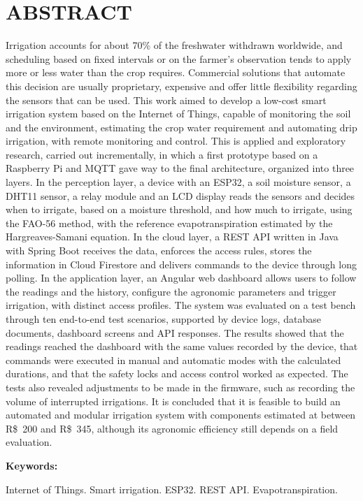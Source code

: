 \chapter*{ABSTRACT} 
\thispagestyle{empty}

Irrigation accounts for about 70\% of the freshwater withdrawn worldwide, and scheduling based on fixed intervals or on the farmer's observation tends to apply more or less water than the crop requires. Commercial solutions that automate this decision are usually proprietary, expensive and offer little flexibility regarding the sensors that can be used. This work aimed to develop a low-cost smart irrigation system based on the Internet of Things, capable of monitoring the soil and the environment, estimating the crop water requirement and automating drip irrigation, with remote monitoring and control. This is applied and exploratory research, carried out incrementally, in which a first prototype based on a Raspberry Pi and MQTT gave way to the final architecture, organized into three layers. In the perception layer, a device with an ESP32, a soil moisture sensor, a DHT11 sensor, a relay module and an LCD display reads the sensors and decides when to irrigate, based on a moisture threshold, and how much to irrigate, using the FAO-56 method, with the reference evapotranspiration estimated by the Hargreaves-Samani equation. In the cloud layer, a REST API written in Java with Spring Boot receives the data, enforces the access rules, stores the information in Cloud Firestore and delivers commands to the device through long polling. In the application layer, an Angular web dashboard allows users to follow the readings and the history, configure the agronomic parameters and trigger irrigation, with distinct access profiles. The system was evaluated on a test bench through ten end-to-end test scenarios, supported by device logs, database documents, dashboard screens and API responses. The results showed that the readings reached the dashboard with the same values recorded by the device, that commands were executed in manual and automatic modes with the calculated durations, and that the safety locks and access control worked as expected. The tests also revealed adjustments to be made in the firmware, such as recording the volume of interrupted irrigations. It is concluded that it is feasible to build an automated and modular irrigation system with components estimated at between R\$~200 and R\$~345, although its agronomic efficiency still depends on a field evaluation.

\vspace{2cm}
{\Large \textbf{Keywords:}}
\vspace{0.4cm}

Internet of Things. Smart irrigation. ESP32. REST API. Evapotranspiration.
